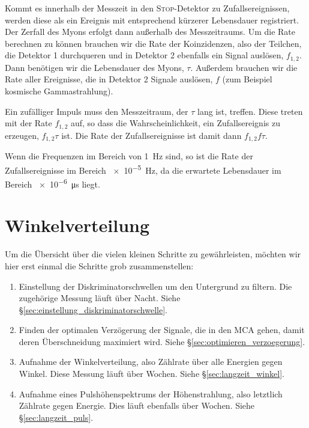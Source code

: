 \documentclass[11pt, ngerman, fleqn, DIV=15, headinclude, BCOR=2cm]{scrreprt}
\begin{document}
Kommt es innerhalb der Messzeit in den \textsc{Stop}-Detektor zu
Zufallsereignissen, werden diese als ein Ereignis mit entsprechend kürzerer
Lebensdauer registriert. Der Zerfall des Myons erfolgt dann außerhalb des
Messzeitraums. Um die Rate berechnen zu können brauchen wir die Rate der
Koinzidenzen, also der Teilchen, die Detektor 1 durchqueren und in Detektor 2
ebenfalls ein Signal auslösen, $f_{1,2}$. Dann benötigen wir die Lebensdauer
des Myons, $\tau$. Außerdem brauchen wir die Rate aller Ereignisse, die in
Detektor 2 Signale auslösen, $f$ (zum Beispiel kosmische Gammastrahlung).

Ein zufälliger Impuls muss den Messzeitraum, der $\tau$ lang ist, treffen.
Diese treten mit der Rate $f_{1,2}$ auf, so dass die Wahrscheinlichkeit, ein
Zufallsereignis zu erzeugen, $f_{1,2} \tau$ ist. Die Rate der Zufallsereignisse
ist damit dann $f_{1,2} f \tau$.

Wenn die Frequenzen im Bereich von \SI{1}{\hertz} sind, so ist die Rate der
Zufallsereignisse im Bereich \SI{e-5}{\hertz}, da die erwartete Lebensdauer im
Bereich \SI{e-6}{\micro\second} liegt.


\chapter{Winkelverteilung}

Um die Übersicht über die vielen kleinen Schritte zu gewährleisten, möchten wir
hier erst einmal die Schritte grob zusammenstellen:

\begin{enumerate}
    \item
        Einstellung der Diskriminatorschwellen um den Untergrund zu filtern.
        Die zugehörige Messung läuft über Nacht. Siehe
        §\ref{sec:einstellung_diskriminatorschwelle}.

    \item
        Finden der optimalen Verzögerung der Signale, die in den MCA gehen,
        damit deren Überschneidung maximiert wird. Siehe
        §\ref{sec:optimieren_verzoegerung}.

    \item
        Aufnahme der Winkelverteilung, also Zählrate über alle Energien gegen
        Winkel. Diese Messung läuft über Wochen. Siehe
        §\ref{sec:langzeit_winkel}.

    \item
        Aufnahme eines Pulshöhenspektrums der Höhenstrahlung, also letztlich
        Zählrate gegen Energie. Dies läuft ebenfalls über Wochen. Siehe
        §\ref{sec:langzeit_puls}.
\end{enumerate}
\end{document}
